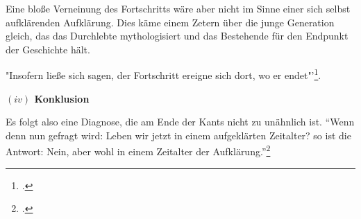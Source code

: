 \documentclass[a4paper, 12pt]{article}
\begin{document}
\begin{onehalfspace}
Eine bloße Verneinung des Fortschritts wäre aber nicht im Sinne einer sich selbst aufklärenden Aufklärung. Dies käme einem Zetern über die junge Generation gleich, das das Durchlebte mythologisiert und das Bestehende für den Endpunkt der Geschichte hält.

"Insofern ließe sich sagen, der Fortschritt ereigne sich dort, wo er endet"'\footnote{\Cite[Siehe][S. 625]{fortschritt}.}.



\vspace{5mm}
%
%
\noindent\textbf{$(iv)$ Konklusion}

\noindent Es folgt also eine Diagnose, die am Ende der Kants nicht zu unähnlich ist. "`Wenn denn nun gefragt wird: Leben wir jetzt in einem aufgeklärten Zeitalter? so ist die Antwort: Nein, aber wohl in einem Zeitalter der Aufklärung."'\footnote{\Cite[Siehe][S. 491]{kant}.}

\newpage

\end{onehalfspace}
\nocite{*}
\printbibliography
\end{document}
